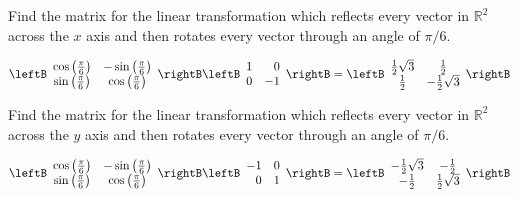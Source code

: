\begin{enumialphparenastyle}
\begin{ex} Find the matrix for the linear transformation which reflects every
vector in $\mathbb{R}^{2}$ across the $x$ axis and then rotates every vector
through an angle of $\pi /6$.
\begin{sol}
\[
\leftB
\begin{array}{cc}
\cos \left( \frac{\pi }{6}\right)  & -\sin \left( \frac{\pi }{6}\right)  \\
\sin \left( \frac{\pi }{6}\right)  & \cos \left( \frac{\pi }{6}\right)
\end{array}
\rightB \leftB
\begin{array}{rr}
1 & 0 \\
0 & -1
\end{array}
\rightB =  \leftB
\begin{array}{cc}
\frac{1}{2}\sqrt{3} & \frac{1}{2} \\
\frac{1}{2} & -\frac{1}{2}\sqrt{3}
\end{array}
\rightB
\]
\end{sol}
\end{ex}

\begin{ex} Find the matrix for the linear transformation which reflects every
vector in $\mathbb{R}^{2}$ across the $y$ axis and then rotates every vector
through an angle of $\pi /6$.
\begin{sol}
\[
\leftB
\begin{array}{cc}
\cos \left( \frac{\pi }{6}\right)  & -\sin \left( \frac{\pi }{6}\right)  \\
\sin \left( \frac{\pi }{6}\right)  & \cos \left( \frac{\pi }{6}\right)
\end{array}
\rightB \leftB
\begin{array}{rr}
-1 & 0 \\
0 & 1
\end{array}
\rightB = \leftB
\begin{array}{cc}
-\frac{1}{2}\sqrt{3} & -\frac{1}{2} \\
-\frac{1}{2} & \frac{1}{2}\sqrt{3}
\end{array}
\rightB
\]
\end{sol}
\end{ex}


\end{enumialphparenastyle}

